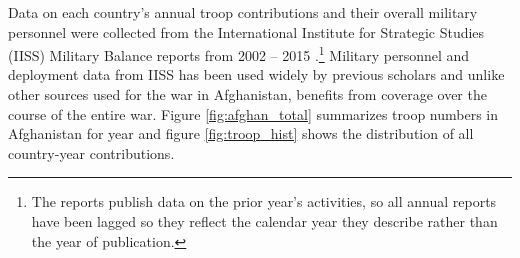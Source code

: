 \documentclass[12pt,letterpaper]{article}
\begin{document}
		Data on each country's annual troop contributions and their overall military personnel were collected from the International Institute for Strategic Studies (IISS) Military Balance reports from 2002 -- 2015 \citep{iiss}.\footnote{The reports publish data on the prior year's activities, so all annual reports have been lagged so they reflect the calendar year they describe rather than the year of publication.} Military personnel and deployment data from IISS has been used widely by previous scholars \citep[e.g.][]{walter_buildingreputationwhy_2006, rovner_hegemonyforceposture_2014, beckley_emergingmilitarybalance_2017, henke_politicsdiplomacyhow_2017} and unlike other sources used for the war in Afghanistan, benefits from coverage over the course of the entire war. Figure \ref{fig:afghan_total} summarizes troop numbers in Afghanistan 
		for year and figure \ref{fig:troop_hist} shows the distribution of all country-year contributions. %

\end{document}

